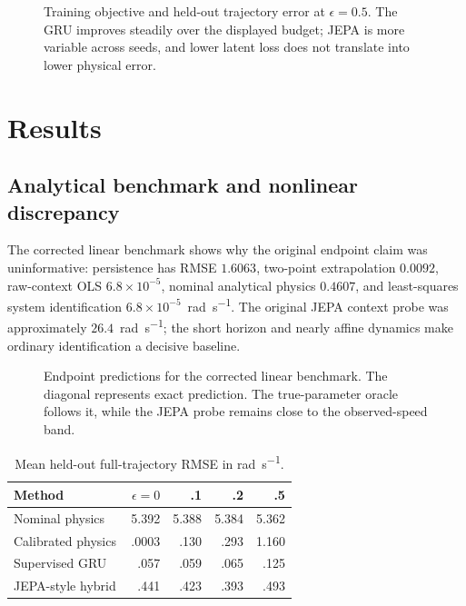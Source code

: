 \documentclass[10pt,journal]{IEEEtran}
\begin{document}
\begin{figure}[!t]
 \centering
 \resizebox{0.96\textwidth}{!}{}
 \caption{Training objective and held-out trajectory error at $\epsilon=0.5$. The GRU improves steadily over the displayed budget; JEPA is more variable across seeds, and lower latent loss does not translate into lower physical error.}
 \label{fig:training}
\end{figure}

\section{Results}
\subsection{Analytical benchmark and nonlinear discrepancy}
The corrected linear benchmark shows why the original endpoint claim was uninformative: persistence has RMSE $1.6063$, two-point extrapolation $0.0092$, raw-context OLS $6.8\times10^{-5}$, nominal analytical physics $0.4607$, and least-squares system identification $6.8\times10^{-5}$~\si{\radian\per\second}. The original JEPA context probe was approximately $26.4$~\si{\radian\per\second}; the short horizon and nearly affine dynamics make ordinary identification a decisive baseline.

\begin{figure}[!t]
 \centering
 
 \caption{Endpoint predictions for the corrected linear benchmark. The diagonal represents exact prediction. The true-parameter oracle follows it, while the JEPA probe remains close to the observed-speed band.}
 \label{fig:analytical}
\end{figure}

\begin{table}[!t]
\caption{Mean held-out full-trajectory RMSE in \si{\radian\per\second}.}
\label{tab:rmse}
\centering\scriptsize
\begin{tabular}{lrrrr}
\toprule
Method & $\epsilon=0$ & .1 & .2 & .5\\
\midrule
Nominal physics & 5.392 & 5.388 & 5.384 & 5.362\\
Calibrated physics & $\,.0003$ & .130 & .293 & 1.160\\
Supervised GRU & .057 & .059 & .065 & .125\\
JEPA-style hybrid & .441 & .423 & .393 & .493\\
\bottomrule
\end{tabular}
\end{table}
\end{document}
